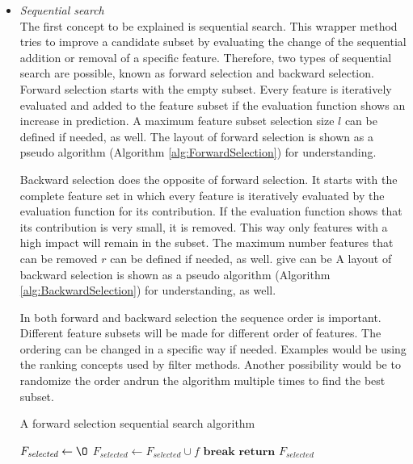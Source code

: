 \documentclass[10pt,a4paper]{article}
\begin{document}
	\begin{itemize}
		\item \textit{Sequential search} \\
		The first concept to be explained is sequential search. This wrapper method tries to improve a candidate subset by evaluating the change of the sequential addition or removal of a specific feature. Therefore, two types of sequential search are possible, known as forward selection and backward selection. Forward selection starts with the empty subset. Every feature is iteratively evaluated and added to the feature subset if the evaluation function shows an increase in prediction. A maximum feature subset selection size $l$  can be defined if needed, as well. The layout of forward selection is shown as a pseudo algorithm (Algorithm \ref{alg:ForwardSelection}) for understanding\cite{Reunanen2006}.
		
		Backward selection does the opposite of forward selection. It starts with the complete feature set in which every feature is iteratively evaluated by the evaluation function for its contribution. If the evaluation function shows that its contribution is very small, it is removed. This way only features with a high impact will remain in the subset. The maximum number features that can be removed $r$ can be defined if needed, as well. give can be A layout of backward selection is shown as a pseudo algorithm (Algorithm \ref{alg:BackwardSelection}) for understanding, as well\cite{Reunanen2006}.
		
		In both forward and backward selection the sequence order is important. Different feature subsets will be made for different order of features. The ordering can be changed in a specific way if needed. Examples would be using the ranking concepts used by filter methods. Another possibility would be to randomize the order andrun the algorithm multiple times to find the best subset\cite{Reunanen2006}.
		
		\begin{algorithm}[H]
			\caption{A forward selection sequential search algorithm\cite{Reunanen2006}}\label{alg:ForwardSelection}
			\begin{algorithmic}[1]
				\State $F_{\textit{selected}} \gets \O$				
											
					
				\State $F_{\textit{selected}} \gets F_{\textit{selected}} \cup f$	
				\EndIf
						
				\State $\textbf{break}$
				\EndIf
				\EndFor
				\State $\textbf{return } F_{\textit{selected}}$
				\EndProcedure
			\end{algorithmic}
		\end{algorithm}
	

\end{itemize}
\end{document}
